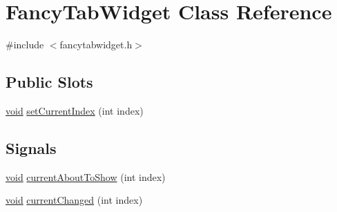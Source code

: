 \hypertarget{class_fancy_tab_widget}{\section{\-Fancy\-Tab\-Widget \-Class \-Reference}
\label{class_fancy_tab_widget}
}


{\ttfamily \#include $<$fancytabwidget.\-h$>$}

\subsection*{\-Public \-Slots}
\begin{DoxyCompactItemize}
\item 
\hyperlink{group___u_a_v_objects_plugin_ga444cf2ff3f0ecbe028adce838d373f5c}{void} \hyperlink{group___core_plugin_ga388605bdeb2516f88d2712b6cffcbc87}{set\-Current\-Index} (int index)
\end{DoxyCompactItemize}
\subsection*{\-Signals}
\begin{DoxyCompactItemize}
\item 
\hyperlink{group___u_a_v_objects_plugin_ga444cf2ff3f0ecbe028adce838d373f5c}{void} \hyperlink{group___core_plugin_ga7e3417f26398fa588e1cb1e5bfc41cee}{current\-About\-To\-Show} (int index)
\item 
\hyperlink{group___u_a_v_objects_plugin_ga444cf2ff3f0ecbe028adce838d373f5c}{void} \hyperlink{group___core_plugin_gac6f521b8b91c3de6a439788d129dd06f}{current\-Changed} (int index)
\end{DoxyCompactItemize}

